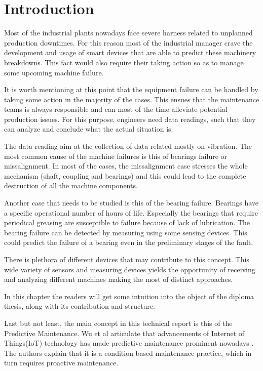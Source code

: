 \chapter{Introduction}
\label{chap1}
{
Most of the industrial plants nowadays face severe harness related to unplanned production downtimes. For this reason most of the industrial manager crave the development and usage of smart devices that are able to predict these machinery breakdowns. This fact would also require their taking action so as to manage some upcoming machine failure. 

It is worth mentioning at this point that the equipment failure can be handled by taking some action in the majority of the cases. This ensues that the maintenance teams is always responsible and can most of the time alleviate potential production issues. For this purpose, engineers need data readings, such that they can analyze and conclude what the actual situation is. 

The data reading aim at the collection of data related mostly on vibration. The most common cause of the machine failures is this of bearings failure or missalignment. In most of the cases, the missalignment case stresses the whole mechanism (shaft, coupling and bearings) and this could lead to the complete destruction of all the machine components. 

Another case that needs to be studied is this of the bearing failure. Bearings have a specific operational number of hours of life. Especially the bearings that require periodical greasing are susceptible to failure because of lack of lubrication. The bearing failure can be detected by measuring using some sensing devices. This could predict the failure of a bearing even in the preliminary stages of the fault.

There is plethora of different devices that may contribute to this concept. This wide variety of sensors and measuring devices yields the opportunity of receiving and analyzing different machines making the most of distinct approaches.

In this chapter the readers will get some intuition into the object of the diploma thesis, along with its contribution and structure. 

Last but not least, the main concept in this technical report is this of the Predictive Maintenance. Wu et al articulate that advancements of Internet of Things(IoT) technology has made predictive maintenance prominent nowadays \cite{WU2025}. The authors explain that it is a condition-based maintenance practice, which in turn requires proactive maintenance. 

}
